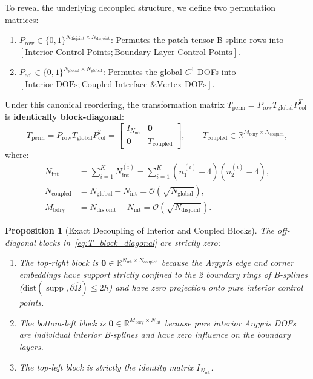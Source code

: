 \documentclass[11pt,a4paper]{article}
\newtheorem{proposition}[theorem]{Proposition}
\newcommand{\R}{\mathbb{R}}
\newcommand{\mb}[1]{\mathbf{#1}}
\begin{document}
To reveal the underlying decoupled structure, we define two permutation matrices:
\begin{enumerate}
    \item $P_{\text{row}} \in \{0, 1\}^{N_{\text{disjoint}} \times N_{\text{disjoint}}}$: Permutes the patch tensor B-spline rows into $[\text{Interior Control Points}; \text{Boundary Layer Control Points}]$.
    \item $P_{\text{col}} \in \{0, 1\}^{N_{\text{global}} \times N_{\text{global}}}$: Permutes the global $C^1$ DOFs into $[\text{Interior DOFs}; \text{Coupled Interface \& Vertex DOFs}]$.
\end{enumerate}

Under this canonical reordering, the transformation matrix $T_{\text{perm}} = P_{\text{row}} T_{\text{global}} P_{\text{col}}^T$ is \textbf{identically block-diagonal}:
\begin{equation} \label{eq:T_block_diagonal}
    T_{\text{perm}} = P_{\text{row}} T_{\text{global}} P_{\text{col}}^T = \begin{bmatrix}
        I_{N_{\text{int}}} & \mb{0} \\
        \mb{0} & T_{\text{coupled}}
    \end{bmatrix}, \qquad T_{\text{coupled}} \in \R^{M_{\text{bdry}} \times N_{\text{coupled}}},
\end{equation}
where:
\begin{align}
    N_{\text{int}} &= \sum_{i=1}^K N_{\text{int}}^{(i)} = \sum_{i=1}^K (n_1^{(i)} - 4)(n_2^{(i)} - 4), \\
    N_{\text{coupled}} &= N_{\text{global}} - N_{\text{int}} = \mathcal{O}(\sqrt{N_{\text{global}}}), \\
    M_{\text{bdry}} &= N_{\text{disjoint}} - N_{\text{int}} = \mathcal{O}(\sqrt{N_{\text{disjoint}}}).
\end{align}

\begin{proposition}[Exact Decoupling of Interior and Coupled Blocks]
The off-diagonal blocks in~\eqref{eq:T_block_diagonal} are strictly zero:
\begin{enumerate}
    \item The top-right block is $\mb{0} \in \R^{N_{\text{int}} \times N_{\text{coupled}}}$ because the Argyris edge and corner embeddings have support strictly confined to the 2 boundary rings of B-splines ($\text{dist}(\operatorname{supp}, \partial\widehat{\Omega}) \le 2h$) and have zero projection onto pure interior control points.
    \item The bottom-left block is $\mb{0} \in \R^{M_{\text{bdry}} \times N_{\text{int}}}$ because pure interior Argyris DOFs are individual interior B-splines and have zero influence on the boundary layers.
    \item The top-left block is strictly the identity matrix $I_{N_{\text{int}}}$.
\end{enumerate}
\end{proposition}
\end{document}

